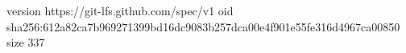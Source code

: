 version https://git-lfs.github.com/spec/v1
oid sha256:612a82ca7b969271399bd16dc9083b257dca00e4f901e55fe316d4967ca00850
size 337
